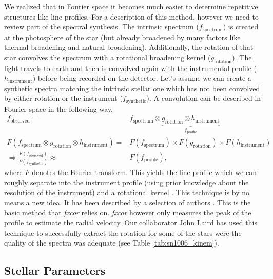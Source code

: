 We realized that in Fourier space it becomes much easier to determine repetitive  structures like line profiles. For a description of this method, however we need to review part of the spectral synthesis. The intrinsic spectrum ($f_\textrm{spectrum}$) is created at the photosphere of the star (but already broadened by many factors like thermal broadening and natural broadening). Additionally, the rotation of that star convolves the spectrum with a rotational broadening kernel ($g_\textrm{rotation}$). The light travels to earth and then is convolved again with the instrumental profile ($h_\textrm{instrument}$) before being recorded on the detector.  Let's assume we can create a synthetic spectra matching the intrinsic stellar one which has not been convolved by either rotation or the instrument ($f_\textrm{synthetic}$). A convolution can be described in Fourier space in the following way,
\begin{align*}
	f_\textrm{observed} =& f_\textrm{spectrum} \otimes \underbrace{g_\textrm{rotation} \otimes h_\textrm{instrument}}_{f_\textrm{profile}}\\
     F(f_\textrm{spectrum} \otimes g_\textrm{rotation} \otimes h_\textrm{instrument}) =& F(f_\textrm{spectrum}) \times F(g_\textrm{rotation}) \times F(h_\textrm{instrument})\\
     \Rightarrow \frac{F(f_\textrm{observed})}{F(f_\textrm{synthetic})} \approx& F(f_\textrm{profile}),
\end{align*}
where $F$ denotes the Fourier transform. This yields the line profile which we can roughly separate into the instrument profile (using prior knowledge about the resolution of the instrument) and a rotational kernel . This technique is by no means a new idea. It has been described by a selection of authors \citep[e.g.][]{1977ApJ...211..198G}. This is the basic method that \textit{fxcor} relies on. \textit{fxcor} however only measures the peak of the profile to estimate the radial velocity. Our collaborator John Laird has used this technique to successfully extract the rotation for some of the stars were the quality of the spectra was adequate (see Table \ref{tab:sn1006_kinem}).


\subsection{Stellar Parameters}
\label{sec:sn1006_stelparam}

